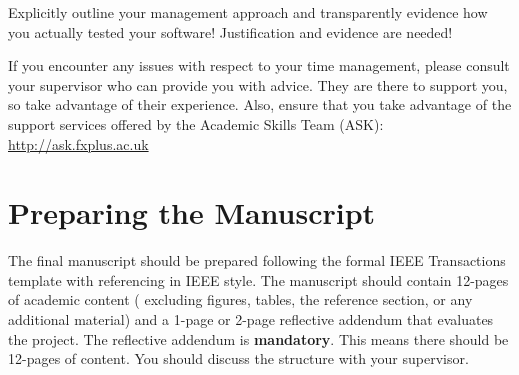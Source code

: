 Explicitly outline your management approach and transparently evidence how you actually tested your software! Justification and evidence are needed!

If you encounter any issues with respect to your time management, please consult your supervisor who can provide you with advice. They are there to support you, so take advantage of their experience. Also, ensure that you take advantage of the support services offered by the Academic Skills Team (ASK): \url{http://ask.fxplus.ac.uk}

\section*{Preparing the Manuscript}

The final manuscript should be prepared following the formal IEEE Transactions template with referencing in IEEE style. The manuscript should contain 12-pages of academic content ( excluding figures, tables, the reference section, or any additional material) and a 1-page or 2-page reflective addendum that evaluates the project. The reflective addendum is \textbf{mandatory}. This means there should be 12-pages of content. You should discuss the structure with your supervisor.

